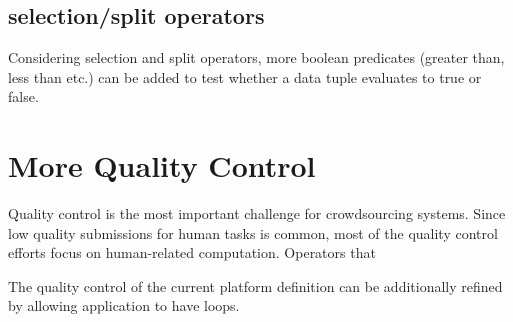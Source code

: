 \subsection{selection/split operators}
Considering selection and split operators, more boolean predicates (greater than, less than etc.) can be added to test whether a data tuple evaluates to true or false.

\section{More Quality Control}
Quality control is the most important challenge for crowdsourcing systems. Since low quality submissions for human tasks is common, most of the quality control efforts focus on human-related computation. Operators that

The quality control of the current platform definition can be additionally refined by allowing application to have loops.   


